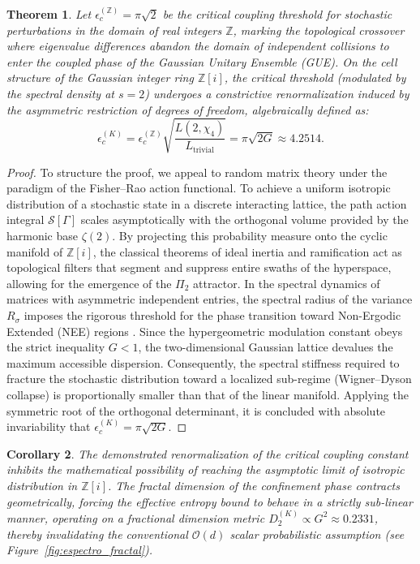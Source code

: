 \documentclass{article}
\numberwithin{equation}{section}
\theoremstyle{plain}
\newtheorem{theorem}{Theorem}[section]
\newtheorem{corollary}[theorem]{Corollary}
\theoremstyle{definition}
\begin{document}
\begin{theorem}
\label{teo:acoplamiento_catalan_formal}
Let $\epsilon_c^{(\mathbb{Z})} = \pi\sqrt{2}$ be the critical coupling threshold for stochastic perturbations in the domain of real integers $\mathbb{Z}$, marking the topological crossover where eigenvalue differences abandon the domain of independent collisions to enter the coupled phase of the Gaussian Unitary Ensemble (GUE). On the cell structure of the Gaussian integer ring $\mathbb{Z}[i]$, the critical threshold (modulated by the spectral density at $s=2$) undergoes a constrictive renormalization induced by the asymmetric restriction of degrees of freedom, algebraically defined as:
\begin{equation}
    \epsilon_c^{(K)} = \epsilon_c^{(\mathbb{Z})} \sqrt{\frac{L(2, \chi_4)}{L_{\text{trivial}}}} = \pi \sqrt{2G} \approx 4.2514.
\end{equation}
\end{theorem}

\begin{proof}
To structure the proof, we appeal to random matrix theory under the paradigm of the Fisher--Rao action functional. To achieve a uniform isotropic distribution of a stochastic state in a discrete interacting lattice, the path action integral $\mathcal{S}[\Gamma]$ scales asymptotically with the orthogonal volume provided by the harmonic base $\zeta(2)$. By projecting this probability measure onto the cyclic manifold of $\mathbb{Z}[i]$, the classical theorems of ideal inertia and ramification act as topological filters that segment and suppress entire swaths of the hyperspace, allowing for the emergence of the $\Pi_2$ attractor.
In the spectral dynamics of matrices with asymmetric independent entries, the spectral radius of the variance $R_{\sigma}$ imposes the rigorous threshold for the phase transition toward Non-Ergodic Extended (NEE) regions \cite{AltErdos2021}. Since the hypergeometric modulation constant obeys the strict inequality $G < 1$, the two-dimensional Gaussian lattice devalues the maximum accessible dispersion. Consequently, the spectral stiffness required to fracture the stochastic distribution toward a localized sub-regime (Wigner--Dyson collapse) is proportionally smaller than that of the linear manifold. Applying the symmetric root of the orthogonal determinant, it is concluded with absolute invariability that $\epsilon_c^{(K)} = \pi\sqrt{2G}$.
\end{proof}

\begin{corollary}
The demonstrated renormalization of the critical coupling constant inhibits the mathematical possibility of reaching the asymptotic limit of isotropic distribution in $\mathbb{Z}[i]$. The fractal dimension of the confinement phase contracts geometrically, forcing the effective entropy bound to behave in a strictly sub-linear manner, operating on a fractional dimension metric $D_2^{(K)} \propto G^2 \approx 0.2331$, thereby invalidating the conventional $\mathcal{O}(d)$ scalar probabilistic assumption (see Figure~\ref{fig:espectro_fractal}).
\end{corollary}
\end{document}
